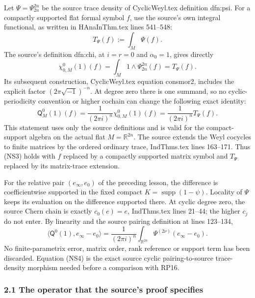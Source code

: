 \documentclass[
  11pt,
]{article}
\begin{document}
Let \(\Psi=\Psi_{2n}^{2n}\) be the source trace density of
CyclicWeyl.tex definition dfn:psi. For a compactly supported flat formal
symbol \(f\), use the source's own integral functional, as written in
HAnaInThm.tex lines 541--548: \[
 T_\Psi(f):=\int_M\Psi(f).
 \tag{NS1}
\] The source's definition dfn:chi, at \(i=r=0\) and \(\alpha_0=1\),
gives directly \[
 \chi_{0,M}^{0}(1)(f)
   =\int_M1\wedge\Psi_{2n}^{2n}(f)
   =T_\Psi(f).
 \tag{NS2}
\] Its subsequent construction, CyclicWeyl.tex equation consmor2,
includes the explicit factor \((2\pi\sqrt{-1})^{-n}\). At degree zero
there is one summand, so no cyclic-periodicity convention or higher
cochain can change the following exact identity: \[
 \mathsf Q_M^0(1)(f)
   =\frac{1}{(2\pi i)^n}\chi_{0,M}^{0}(1)(f)
   =\frac{1}{(2\pi i)^n}T_\Psi(f).
 \tag{NS3}
\] This statement uses only the source definitions and is valid for the
compact-support algebra on the actual flat \(M=\mathbb R^{2n}\). The
source extends the Weyl cocycles to finite matrices by the ordered
ordinary trace, IndThms.tex lines 163--171. Thus (NS3) holds with \(f\)
replaced by a compactly supported matrix symbol and \(T_\Psi\) replaced
by its matrix-trace extension.

For the relative pair \((e_\infty,e_0)\) of the preceding lesson, the
difference is coefficientwise supported in the fixed compact
\(K=\operatorname{supp}(1-\psi)\). Locality of \(\Psi\) keeps its
evaluation on the difference supported there. At cyclic degree zero, the
source Chern chain is exactly \(c_0(e)=e\), IndThms.tex lines 21--44;
the higher \(c_j\) do not enter. By linearity and the source pairing
definition at lines 123--134, \[
 \big\langle\mathsf Q^0(1),e_\infty-e_0\big\rangle
  =\frac{1}{(2\pi i)^n}
      \int_{\mathbb R^{2n}}
        \Psi^{(2\nu)}(e_\infty-e_0).
 \tag{NS4}
\] No finite-parametrix error, matrix order, rank reference or support
term has been discarded. Equation (NS4) is the exact source cyclic
pairing-to-source trace-density morphism needed before a comparison with
RP16.

\subsubsection{2.1 The operator that the source's proof
specifies}\label{the-operator-that-the-sources-proof-specifies}
\end{document}
